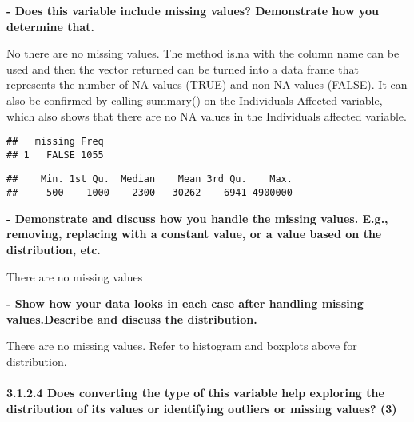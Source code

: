 \documentclass[
]{article}
\newenvironment{Shaded}{\begin{snugshade}}{\end{snugshade}}
\newcommand{\FunctionTok}[1]{\textcolor[rgb]{0.00,0.00,0.00}{#1}}
\newcommand{\NormalTok}[1]{#1}
\newcommand{\OtherTok}[1]{\textcolor[rgb]{0.56,0.35,0.01}{#1}}
\newcommand{\SpecialCharTok}[1]{\textcolor[rgb]{0.00,0.00,0.00}{#1}}
\begin{document}
\textbf{- Does this variable include missing values? Demonstrate how you
determine that.}

No there are no missing values. The method is.na with the column name
can be used and then the vector returned can be turned into a data frame
that represents the number of NA values (TRUE) and non NA values
(FALSE). It can also be confirmed by calling summary() on the
Individuals Affected variable, which also shows that there are no NA
values in the Individuals affected variable.

\begin{Shaded}
\end{Shaded}

\begin{verbatim}
##   missing Freq
## 1   FALSE 1055
\end{verbatim}

\begin{Shaded}
\end{Shaded}

\begin{verbatim}
##    Min. 1st Qu.  Median    Mean 3rd Qu.    Max. 
##     500    1000    2300   30262    6941 4900000
\end{verbatim}

\textbf{- Demonstrate and discuss how you handle the missing values.
E.g., removing, replacing with a constant value, or a value based on the
distribution, etc.}

There are no missing values

\textbf{- Show how your data looks in each case after handling missing
values.Describe and discuss the distribution.}

There are no missing values. Refer to histogram and boxplots above for
distribution.

\hypertarget{does-converting-the-type-of-this-variable-help-exploring-the-distribution-of-its-values-or-identifying-outliers-or-missing-values-3-1}{%
\paragraph{3.1.2.4 Does converting the type of this variable help
exploring the distribution of its values or identifying outliers or
missing values?
(3)}\label{does-converting-the-type-of-this-variable-help-exploring-the-distribution-of-its-values-or-identifying-outliers-or-missing-values-3-1}}
\end{document}
